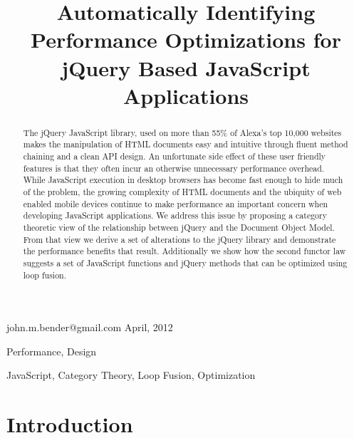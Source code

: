 \documentclass[preprint, leqno]{sigplanconf}
\begin{document}
\copyrightdata{[to be supplied]}


\title{Automatically Identifying Performance Optimizations for jQuery Based JavaScript Applications}

           {john.m.bender@gmail.com}
           {April, 2012}

\maketitle

\begin{abstract}
The jQuery JavaScript library, used on more than 55\% of Alexa's top 10,000 websites \cite{bib:usage} makes the manipulation of HTML documents easy and intuitive through fluent method chaining and a clean API design. An unfortunate side effect of these user friendly features is that they often incur an otherwise unnecessary performance overhead. While JavaScript execution in desktop browsers has become fast enough to hide much of the problem, the growing complexity of HTML documents and the ubiquity of web enabled mobile devices continue to make performance an important concern when developing JavaScript applications. We address this issue by proposing a category theoretic view of the relationship between jQuery and the Document Object Model. From that view we derive a set of alterations to the jQuery library and demonstrate the performance benefits that result. Additionally we show how the second functor law suggests a set of JavaScript functions and jQuery methods that can be optimized using loop fusion.
\end{abstract}


\terms
Performance, Design

\keywords
JavaScript, Category Theory, Loop Fusion, Optimization

\section{Introduction}
\end{document}
